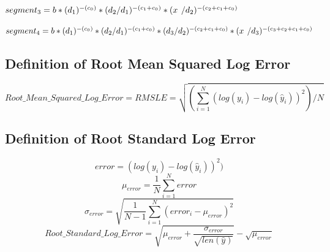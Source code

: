 \documentclass{article} %
\begin{document}
$segment_3 = b * (d_1)^{-(c_0)} * (d_2/d_1)^{-(c_1+c_0)} * (x\hspace{.14cm}/d_2)^{-(c_2+c_1+c_0)}$

$segment_4 = b * (d_1)^{-(c_0)} * (d_2/d_1)^{-(c_1+c_0)} * (d_3/d_2)^{-(c_2+c_1+c_0)} * (x\hspace{.14cm}/d_3)^{-(c_3+c_2+c_1+c_0)}$




\subsection{Definition of Root Mean Squared Log Error}
\label{section:definition_of_Root_Mean_Squared_Log_Error}

\[Root\_Mean\_Squared\_Log\_Error = RMSLE = \sqrt{(\sum_{i=1}^{N}(log(y_{i})-log(\hat{y}_{i}))^2)/N}\]

\subsection{Definition of Root Standard Log Error}
\label{section:definition_of_Root_Standard_Log_Error}

\[error = (log(y_{i})-log(\hat{y}_{i}))^2)\] 
\[\mu_{error} = \frac{1}{N}\sum_{i=1}^N error\]
\[\sigma_{error} = \sqrt{\frac{1}{N-1}\sum_{i=1}^N(error_i-\mu_{error})^2}\]
\[Root\_Standard\_Log\_Error = \sqrt{\mu_{error} + \frac{\sigma_{error}}{\sqrt{len(\hat{y})}}} - \sqrt{\mu_{error}}\] 

\end{document}
